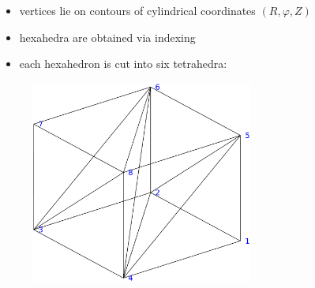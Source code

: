 \documentclass{beamer}
\begin{document}
\begin{frame}
\begin{columns}[onlytextwidth]
\begin{column}{0.48\textwidth}
\begin{center}
			\begin{itemize}
				\item vertices lie on contours of cylindrical coordinates $(R,\varphi,Z)$
				\item hexahedra are obtained via indexing
				\item each hexahedron is cut into six tetrahedra:
			\end{itemize}
		\end{center}
	\begin{figure}
		\vspace{-0.5cm}\includegraphics[trim={0 3cm 0cm 2cm},clip,width=0.65\textwidth]{FIGURES/Tetra_split.eps}
	\end{figure}
	\end{column}
\end{columns}
\end{frame}
\end{document}
